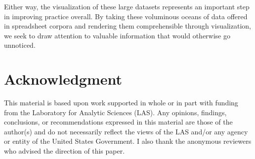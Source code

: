 \documentclass[conference]{IEEEtran}
\begin{document}
	Either way, the visualization of these large datasets represents an important
	step in improving practice overall. By taking these voluminous oceans of data
	offered in spreadsheet corpora and rendering them comprehensible through
	visualization, we seek to draw attention to valuable information that would
	otherwise go unnoticed.
	
	\section*{Acknowledgment} This material is based upon work supported in whole
	or in part with funding from the Laboratory for Analytic Sciences (LAS). Any
	opinions, findings, conclusions, or recommendations expressed in this material
	are those of the author(s) and do not necessarily reflect the views of the LAS
	and/or any agency or entity of the United States Government. I also thank the
	anonymous reviewers who advised the direction of this paper.
	
	
	
	
	
	
\end{document}
